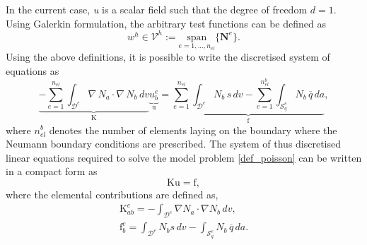 In the current case, \emph{u} is a scalar field such that the degree of freedom $d = 1$.
 Using Galerkin formulation, the arbitrary test functions can be defined as
\begin{equation}
    w^{h} \in \mathcal{V}^{h} := \underset{{e = 1,...,n_{el}}}{\mathrm{span}}\{\mathbf{N}^{e}\}.
\end{equation}
%
Using the above definitions, it is possible to write the discretised system of equations as 
\begin{equation}\label{discretised_poisson}
    \underbrace{-\sum^{n_{el}}_{e=1} \int_{\mathcal{D}^{e}} \nabla \, N_{a} \cdot \nabla \, N_{b} \, dv}_{\boldsymbol{\mathrm{K}}} \underbrace{u_{b}^{e}}_{\boldsymbol{\mathrm{u}}} = 
    \underbrace{\sum^{n_{el}}_{e=1} \int_{\mathcal{D}^{e}} N_{b}\, s \,dv - \sum^{n^{b}_{el}}_{e=1} \int_{\mathcal{S}^{e}_{q}} N_{b} \,\overline{q} \,da}_{\boldsymbol{\mathrm{f}}}  ,
\end{equation}
where $n^{b}_{el}$ denotes the number of elements laying on the boundary where the Neumann boundary conditions are prescribed. The system of thus discretised linear equations required to solve the
 model problem \eqref{def_poisson} can be written in a compact form as
 \begin{equation}\label{FEM}
    \boldsymbol{\mathrm{Ku}} = \boldsymbol{\mathrm{f}}, 
 \end{equation}
where the elemental contributions are defined as,
\begin{gather}\label{K_and_f}
    \boldsymbol{\mathrm{K}}^{e}_{ab} = -\int_{\mathcal{D}^{e}} \nabla N_a \cdot \nabla N_b \, dv,\\
    \boldsymbol{\mathrm{f}}^{e}_{b} = \int_{\mathcal{D}^{e}} N_b s \,dv - \int_{\mathcal{S}^{e}_{q}} N_{b} \,\overline{q} \,da.
\end{gather}

